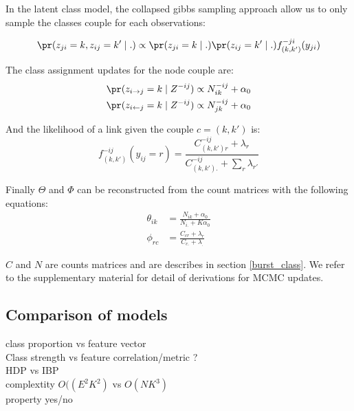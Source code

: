 In the latent class model, the collapsed gibbs sampling approach allow us to only sample the classes couple for each observations:

\begin{equation}
\pr(z_{ji}=k, z_{ij}=k' \mid .) \propto \pr(z_{ji}=k \mid .) \pr(z_{ij}=k' \mid .) f_{(k,k')}^{-ji}(y_{ji})
\end{equation}


The class assignment updates for the node couple are:
\begin{align}
\pr(z_{i\rightarrow j} =k \mid Z^{-ij}) &\propto N_{ik}^{-ij} + \alpha_0 \\
\pr(z_{i\leftarrow j} =k \mid Z^{-ij}) &\propto N_{jk}^{-ij} + \alpha_0 
\end{align}

And the likelihood of a link given the couple $c=(k, k')$ is:
\begin{equation} \label{eq:cgs_mmsb}
f_{(k, k')}^{-ij}(y_{ij}=r) = \frac{C_{(k,k')r}^{-ij} + \lambda_r}{C_{(k,k')\bm{.}}^{-ij} + \sum_r\lambda_{r'}} 
\end{equation}

Finally $\Theta$ and $\Phi$ can be reconstructed from the count matrices with the following equations:
\begin{align}
\theta_{ik} &= \frac{N_{ik} + \alpha_0}{ N_{i\bm{.}} + K\alpha_0} \\
\phi_{rc} &= \frac{C_{cr} + \lambda_r}{ C_{c.} + \lambda_{\bm{.}}}
\end{align}

$C$ and $N$ are counts matrices and are describes in section \ref{burst_class}. We refer to the supplementary material for detail of derivations for MCMC updates. 


\subsection{Comparison of models}
class proportion vs feature vector \\
Class strength vs feature correlation/metric ? \\
HDP vs IBP \\
complextity $O((E^2K^2)$ vs $O(NK^3)$ \\
property yes/no

